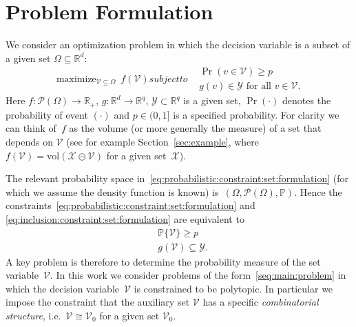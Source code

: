 \documentclass[letterpaper, 10pt, conference]{ieeeconf} %
\DeclareMathOperator*{\maximize}{maximize}
\begin{document}
\section{Problem Formulation}\label{sec:problem:formulation}
%
%
%
We consider an optimization problem in which the decision variable is a subset of a given set $\Omega \subseteq \mathbb R^d$: 
%
\begin{subequations}\label{seq:main:problem}
\begin{equation}
\maximize_{\mathcal V\subseteq \Omega} \ f(\mathcal V)
\end{equation}
subject to
\begin{align}
\label{eq:probabilistic:constraint:set:formulation}
        & \Pr (v\in\mathcal V) \geq p \\
\label{eq:inclusion:constraint:set:formulation}
        & g(v)\in\mathcal Y \text{ for all } v \in \mathcal V.
\end{align}
\end{subequations}
%
Here $f: \mathscr P (\Omega) \to \mathbb R_+$, $g:\mathbb R^d\rightarrow \mathbb R^q$, $\mathcal Y\subset\mathbb R^q$ is a given set, $\Pr(\cdot)$ denotes the probability of event $(\cdot)$  and $p\in (0,1]$ is a specified probability.
%
For clarity we can think of~$f$ as the volume (or more generally the measure) of a set that depends on $\mathcal V$ (see for example Section~\ref{sec:example}, where $f(\mathcal V) = \text{vol}(\mathcal X\ominus\mathcal V)$ for a
given set~$\mathcal X$).
%

The relevant probability space in~\eqref{eq:probabilistic:constraint:set:formulation} (for which we assume the density function is known) is~$(\Omega, \mathscr P(\Omega), \mathbb P)$.
Hence the constraints~\eqref{eq:probabilistic:constraint:set:formulation} and \eqref{eq:inclusion:constraint:set:formulation}
 are equivalent to
%
\begin{subequations}
\begin{align}
	& \mathbb P\{\mathcal V\}\geq p \\
        & g(\mathcal V) \subseteq \mathcal Y .
\end{align}
%
\end{subequations}
%
A key problem is therefore to determine the probability measure of the set variable~$\mathcal V$.
%
In this work we consider problems of the form~\eqref{seq:main:problem} in which the decision variable~$\mathcal V$ is constrained to be polytopic. In particular we impose the constraint that the auxiliary set $\mathcal V$ has a specific \emph{combinatorial structure}, i.e.~$\mathcal V\cong\mathcal V_0$ for a given set $\mathcal V_0$.
%
\end{document}
